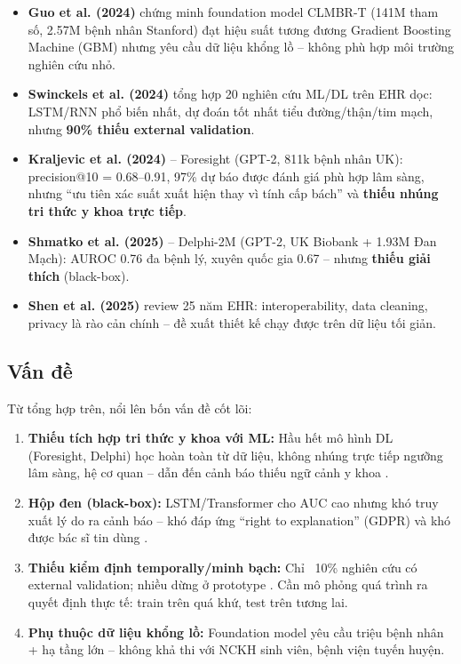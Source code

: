\documentclass[13pt,a4paper]{article}
\begin{document}
\begin{itemize}
    \item \textbf{Guo et al. (2024)} \cite{guo2024} chứng minh foundation model CLMBR-T (141M tham số, 2.57M bệnh nhân Stanford) đạt hiệu suất tương đương Gradient Boosting Machine (GBM) nhưng yêu cầu dữ liệu khổng lồ -- không phù hợp môi trường nghiên cứu nhỏ.
    \item \textbf{Swinckels et al. (2024)} \cite{swinckels2024} tổng hợp 20 nghiên cứu ML/DL trên EHR dọc: LSTM/RNN phổ biến nhất, dự đoán tốt nhất tiểu đường/thận/tim mạch, nhưng \textbf{90\% thiếu external validation}.
    \item \textbf{Kraljevic et al. (2024)} \cite{kraljevic2024} -- Foresight (GPT-2, 811k bệnh nhân UK): precision@10 = 0.68--0.91, 97\% dự báo được đánh giá phù hợp lâm sàng, nhưng ``ưu tiên xác suất xuất hiện thay vì tính cấp bách'' và \textbf{thiếu nhúng tri thức y khoa trực tiếp}.
    \item \textbf{Shmatko et al. (2025)} \cite{shmatko2025} -- Delphi-2M (GPT-2, UK Biobank + 1.93M Đan Mạch): AUROC 0.76 đa bệnh lý, xuyên quốc gia 0.67 -- nhưng \textbf{thiếu giải thích} (black-box).
    \item \textbf{Shen et al. (2025)} \cite{shen2025} review 25 năm EHR: interoperability, data cleaning, privacy là rào cản chính -- đề xuất thiết kế chạy được trên dữ liệu tối giản.
\end{itemize}

\subsection{Vấn đề}

Từ tổng hợp trên, nổi lên bốn vấn đề cốt lõi:

\begin{enumerate}
    \item \textbf{Thiếu tích hợp tri thức y khoa với ML:} Hầu hết mô hình DL (Foresight, Delphi) học hoàn toàn từ dữ liệu, không nhúng trực tiếp ngưỡng lâm sàng, hệ cơ quan -- dẫn đến cảnh báo thiếu ngữ cảnh y khoa \cite{kraljevic2024,shmatko2025}.
    \item \textbf{Hộp đen (black-box):} LSTM/Transformer cho AUC cao nhưng khó truy xuất lý do ra cảnh báo -- khó đáp ứng ``right to explanation'' (GDPR) và khó được bác sĩ tin dùng \cite{swinckels2024,kraljevic2024}.
    \item \textbf{Thiếu kiểm định temporally/minh bạch:} Chỉ ~10\% nghiên cứu có external validation; nhiều dừng ở prototype \cite{swinckels2024}. Cần mô phỏng quá trình ra quyết định thực tế: train trên quá khứ, test trên tương lai.
    \item \textbf{Phụ thuộc dữ liệu khổng lồ:} Foundation model yêu cầu triệu bệnh nhân + hạ tầng lớn \cite{guo2024,shen2025} -- không khả thi với NCKH sinh viên, bệnh viện tuyến huyện.
\end{enumerate}
\end{document}
